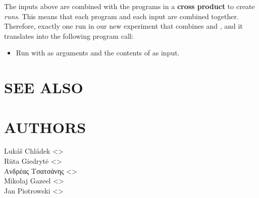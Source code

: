 \documentclass[a4paper,english]{article}
\begin{document}
\begin{adjustwidth}{18pt}{0pt}
    The inputs above are combined with the programs in a \textbf{cross product}
    to create \emph{runs}.
    This means that each program and each input are combined together.
    Therefore, exactly one run in our new experiment that combines
     and , and it translates into the following
    program call:
    \begin{itemize}
    \item Run  with  as arguments and
    the contents of  as input.
    \end{itemize}

    \section{SEE ALSO}



    \section{AUTHORS}
    Lukáš Chládek <>\\[0.1cm]\MANbr
    Rūta Giedrytė <>\\[0.1cm]\MANbr
    Ανδρέας Τσατσάνης <>\\[0.1cm]\MANbr
    Mikołaj Gazeel <>\\[0.1cm]\MANbr
    Jan Piotrowski <>
\end{adjustwidth}
\end{document}

